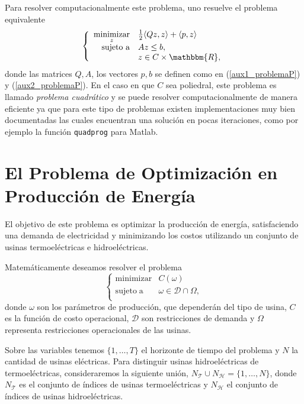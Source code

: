 \documentclass[a4paper,12pt]{report}
\newcommand{\la}{\langle}
\newcommand{\ra}{\rangle}
\newcommand{\RR}{\mathbbm{R}}
\newcommand{\om}{\omega}
\newcommand{\cT}{\mathcal{T}}
\newcommand{\cH}{\mathcal{H}}
\newcommand{\cD}{\mathcal{D}}
\newcounter{ejemplo}
\begin{document}
Para resolver computacionalmente este problema, uno resuelve el problema equivalente
\begin{equation}
\left\{
 \begin{array}{rl}
  \displaystyle{\mathop{\mathrm{minimizar}}_{z}} & \frac{1}{2}\la Qz,z\ra+\la p,z\ra\\
  \mbox{sujeto a}& Az\leq b,\\
&z\in C\times\RR,
 \end{array}
\right.
\end{equation}
donde las matrices $Q, A$, los vectores $p,b$ se definen como en (\ref{aux1_problemaP}) y (\ref{aux2_problemaP}). 
En el caso en que $C$ sea poliedral, este problema es llamado {\em problema cuadr\'atico} y se puede resolver computacionalmente de manera eficiente ya que para este tipo de problemas existen implementaciones muy bien documentadas las cuales encuentran una soluci\'on en pocas iteraciones, como por ejemplo la funci\'on \texttt{quadprog} para Matlab.


\chapter{El Problema de Optimizaci\'on en Producci\'on de Energ\'ia}

El objetivo de este problema es optimizar la producci\'on de energ\'ia, sa\-tis\-fa\-ci\-en\-do una demanda de electricidad y minimizando los costos utilizando un conjunto de usinas termoel\'ectricas e hidroel\'ectricas.

Matem\'aticamente deseamos resolver el problema
\begin{equation}
\left\{
 \begin{array}{rc}
  \mathrm{minimizar}&C(\omega)\\
  \mathrm{sujeto\;a}&\om\in\mathcal{D}\cap\Omega,\\
 \end{array}
\right.
\end{equation}
donde $\om$ son los par\'ametros de producci\'on, que depender\'an del tipo de usina, $C$ es la funci\'on de costo operacional, $\cD$ son restricciones de demanda y $\Omega$ representa restricciones operacionales de las usinas.

Sobre las variables tenemos $\{1,\ldots,T\}$ el horizonte de tiempo del problema y $N$ la cantidad de usinas el\'ectricas. Para distinguir usinas hidroel\'ectricas de termoel\'ectricas, consideraremos la siguiente uni\'on, $N_{\cT} \cup N_{\cH} = \{1,\ldots,N\}$, donde $N_{\cT}$ es el conjunto de \'indices de usinas termoel\'ectricas y $N_{\cH}$ el conjunto de \'indices de usinas hidroel\'ectricas.
\end{document}
